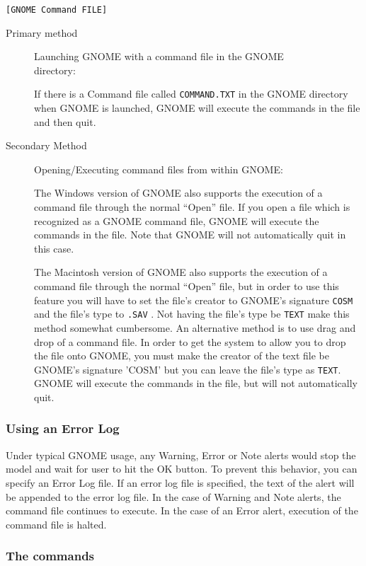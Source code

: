 \documentclass[12pt]{article}      %
\newcommand{\gnome}{\textsf{GNOME}\xspace}
\newcommand{\filename}[1]{\texttt{#1}}
\newcommand{\command}[1]{\texttt{#1}}
\newcommand{\fileline}[1]{\begin{flushleft}\texttt{#1}\end{flushleft}}
\begin{document}
\fileline{[GNOME Command FILE]}

\begin{description}
\item[Primary method] Launching \gnome with a command file in the \gnome\\directory:

If there is a Command file called \filename{COMMAND.TXT} in the \gnome directory
when \gnome is launched, \gnome will execute the commands in the file
and then quit.

\item[Secondary Method]Opening/Executing command files from within \gnome:

The Windows version of \gnome also supports the execution of a command
file through the normal ``Open'' file.  If you open a file which is
recognized as a \gnome command file, \gnome will execute the commands in
the file.  Note that \gnome will not automatically quit in this case.

The Macintosh version of \gnome also supports the execution of a command
file through the normal ``Open'' file, but in order to use this feature
you will have to set the file's creator to \gnome's signature
\command{COSM} and the file's type to \command{.SAV} .  Not having the
file's type be \command{TEXT} make this method somewhat cumbersome.  An
alternative method is to use drag and drop of a command file.  In order
to get the system to allow you to drop the file onto \gnome, you must
make the creator of the text file be \gnome's signature 'COSM' but you
can leave the file's type as \command{TEXT}.  \gnome will execute the
commands in the file, but will not automatically quit.
\end{description}


\subsubsection{Using an Error Log}

Under typical \gnome usage, any Warning, Error or Note alerts would stop
the model and wait for user to hit the OK button.  To prevent this
behavior, you can specify an Error Log file.  If an error log file is
specified, the text of the alert will be appended to the error log file.
In the case of Warning and Note alerts, the command file continues to
execute.  In the case of an Error alert, execution of the command file
is halted.


\subsubsection{The commands}
\end{document}
